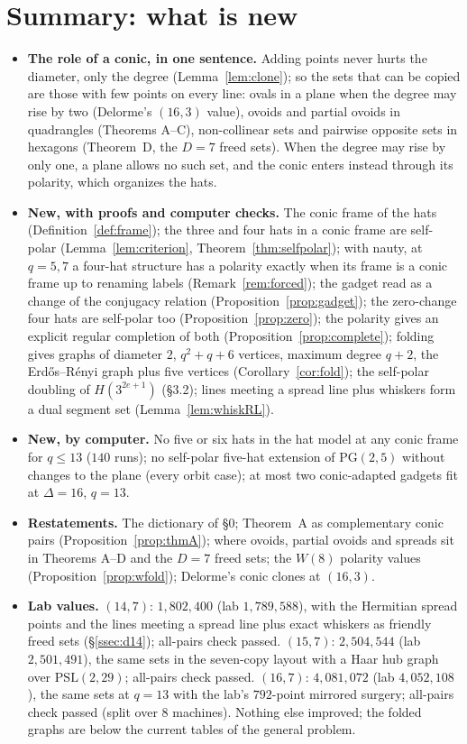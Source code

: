 \documentclass[11pt]{amsart}
\theoremstyle{definition}
\theoremstyle{remark}
\newcommand{\PG}{\mathrm{PG}}
\begin{document}
\section{Summary: what is new}\label{sec:summary}
\begin{itemize}
\item \textbf{The role of a conic, in one sentence.} Adding points never hurts the diameter, only the degree
(Lemma~\ref{lem:clone}); so the sets that can be copied are those with few points on every line: ovals in a plane when
the degree may rise by two (Delorme's $(16,3)$ value), ovoids and partial ovoids in quadrangles (Theorems A--C),
non-collinear sets and pairwise opposite sets in hexagons (Theorem~D, the $D=7$ freed sets). When the degree may rise by
only one, a plane allows no such set, and the conic enters instead through its polarity, which organizes the hats.
\item \textbf{New, with proofs and computer checks.} The conic frame of the hats (Definition~\ref{def:frame}); the
three and four hats in a conic frame are self-polar (Lemma~\ref{lem:criterion}, Theorem~\ref{thm:selfpolar}); with
nauty, at $q=5,7$ a four-hat structure has a polarity exactly when its frame is a conic frame up to renaming labels
(Remark~\ref{rem:forced}); the gadget read as a change of the conjugacy relation (Proposition~\ref{prop:gadget}); the
zero-change four hats are self-polar too (Proposition~\ref{prop:zero}); the polarity gives an explicit regular completion
of both (Proposition~\ref{prop:complete}); folding gives graphs of diameter $2$, $q^2+q+6$ vertices, maximum degree
$q+2$, the Erd\H{o}s--R\'enyi graph plus five vertices (Corollary~\ref{cor:fold}); the self-polar doubling of
$H(3^{2e+1})$ (\S3.2); lines meeting a spread line plus whiskers form a dual segment set (Lemma~\ref{lem:whiskRL}).
\item \textbf{New, by computer.} No five or six hats in the hat model at any conic frame for $q\le13$ ($140$ runs); no
self-polar five-hat extension of $\PG(2,5)$ without changes to the plane (every orbit case); at most two
conic-adapted gadgets fit at $\Delta=16$, $q=13$.
\item \textbf{Restatements.} The dictionary of \S0; Theorem~A as complementary conic pairs (Proposition~\ref{prop:thmA});
where ovoids, partial ovoids and spreads sit in Theorems A--D and the $D=7$ freed sets; the $W(8)$ polarity values
(Proposition~\ref{prop:wfold}); Delorme's conic clones at $(16,3)$.
\item \textbf{Lab values.} $(14,7)$: $1{,}802{,}400$ (lab $1{,}789{,}588$), with the Hermitian spread points and the
lines meeting a spread line plus exact whiskers as friendly freed sets (\S\ref{ssec:d14}); all-pairs check passed.
$(15,7)$: $2{,}504{,}544$ (lab $2{,}501{,}491$), the same sets in the seven-copy layout with a Haar hub graph over
$\mathrm{PSL}(2,29)$; all-pairs check passed.
$(16,7)$: $4{,}081{,}072$ (lab $4{,}052{,}108$), the same sets at $q=13$ with the lab's $792$-point mirrored surgery;
all-pairs check passed (split over $8$ machines). Nothing else improved; the
folded graphs are below the current tables of the general problem.
\end{itemize}
\end{document}
